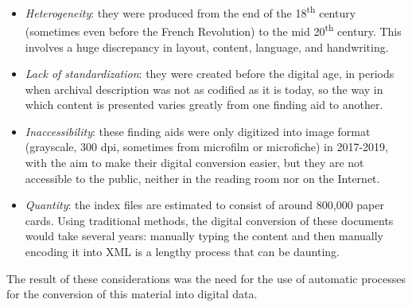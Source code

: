 \documentclass[runningheads]{llncs}
\begin{document}
\begin{itemize}
    \item \textit{Heterogeneity}: they were produced from the end of the 18\textsuperscript{th} century (sometimes even before the French Revolution) to the mid 20\textsuperscript{th} century. This involves a huge discrepancy in layout, content, language, and handwriting.
\item \textit{Lack of standardization}: they were created before the digital age, in periods when archival description was not as codified as it is today, so the way in which content is presented varies greatly from one finding aid to another.
    \item \textit{Inaccessibility}: these finding aids were only digitized into image format (grayscale, 300 dpi, sometimes from microfilm or microfiche) in 2017-2019, with the aim to make their digital conversion easier, but they are not accessible to the public, neither in the reading room nor on the Internet.
    \item \textit{Quantity}: the index files are estimated to consist of around 800,000 paper cards. Using traditional methods, the digital conversion of these documents would take several years: manually typing the content and then manually encoding it into XML is a lengthy process that can be daunting.

\end{itemize}
The result of these considerations was the need for the use of automatic processes for the conversion of this material into digital data. 
\end{document}

